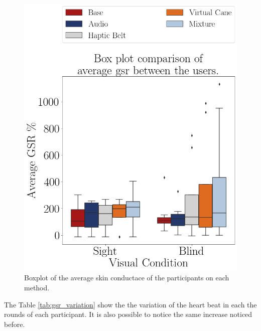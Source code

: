 \begin{figure}[!htb]
    \centering
    \includegraphics[width = 0.5\linewidth]{Resultados/GSR/Figuras/png/boxplot_gsr_scene.png}
    \caption{Boxplot of the average skin conductace of the participants on each method.}
    \label{fig:boxplot_gsr_scene}
\end{figure}

The Table \ref{tab:gsr_variation} show the the variation of the heart beat in each the rounds of each participant. It is also possible to notice the same increase noticed before.


